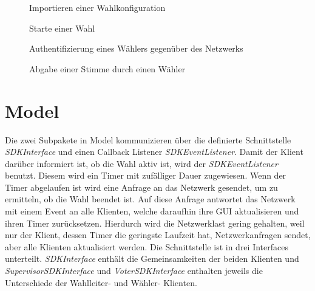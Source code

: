 \documentclass[parskip=full]{scrartcl}
\newcommand{\textitx}[1]{\mbox{\textit{#1}}}
\begin{document}
	\newpage
	\begin{figure}
		\centering
		\hspace{-100pt}
		\centerline{}
		\caption{Importieren einer Wahlkonfiguration}
		\label{fig:config_import}
	\end{figure}

	\newpage
	\begin{figure}
		\centering
		\hspace{-100pt}
		\centerline{}
		\caption{Starte einer Wahl}
		\label{fig:start_election}
	\end{figure}

	\newpage
	\begin{figure}
		\centering
		\hspace{-100pt}
		\centerline{}
		\caption{Authentifizierung eines Wählers gegenüber des Netzwerks}
		\label{fig:voter_auth}
	\end{figure}

	\newpage
	\begin{figure}
		\centering
		\hspace{-100pt}
		\centerline{}
		\caption{Abgabe einer Stimme durch einen Wähler}
		\label{fig:vote_sequence}
	\end{figure}

	\newpage
	\section{Model}
	\pagestyle{plain}
	Die zwei Subpakete in Model kommunizieren über die definierte Schnittstelle \textitx{SDKInterface} und einen Callback Listener \textitx{SDKEventListener}. 
	Damit der Klient darüber informiert ist, ob die Wahl aktiv ist, wird der \textitx{SDKEventListener} benutzt. Diesem wird ein Timer mit zufälliger Dauer zugewiesen. Wenn der Timer abgelaufen ist wird eine Anfrage an das Netzwerk gesendet, um zu ermitteln, ob die Wahl beendet ist. Auf diese Anfrage antwortet das Netzwerk mit einem Event an alle Klienten, welche daraufhin ihre GUI aktualisieren und ihren Timer zurücksetzen. Hierdurch wird die Netzwerklast gering gehalten, weil nur der Klient, dessen Timer die geringste Laufzeit hat, Netzwerkanfragen sendet, aber alle Klienten aktualisiert werden.
	Die Schnittstelle ist in drei Interfaces unterteilt. \textitx{SDKInterface} enthält die Gemeinsamkeiten der beiden Klienten und \textitx{SupervisorSDKInterface} und \textitx{VoterSDKInterface} enthalten jeweils die Unterschiede der Wahlleiter- und Wähler- Klienten.
\end{document}
